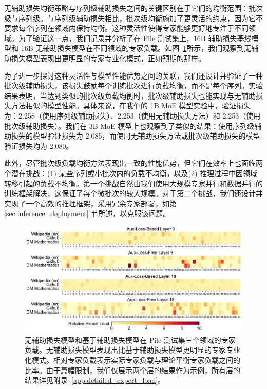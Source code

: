 \documentclass[lang=cn,a4paper,newtx]{elegantpaper}
\begin{document}
无辅助损失均衡策略与序列级辅助损失之间的关键区别在于它们的均衡范围：批次级与序列级。与序列级辅助损失相比，批次级均衡施加了更灵活的约束，因为它不要求每个序列在领域内保持均衡。这种灵活性使得专家能够更好地专注于不同领域。为了验证这一点，我们记录并分析了在 Pile 测试集上，16B 辅助损失基线模型和 16B 无辅助损失模型在不同领域的专家负载。如图~\ref{fig:expert_load}所示，我们观察到无辅助损失模型表现出更明显的专家专业化模式，正如预期的那样。

为了进一步探讨这种灵活性与模型性能优势之间的关联，我们还设计并验证了一种批次级辅助损失，该损失鼓励每个训练批次进行负载均衡，而不是每个序列。实验结果表明，当达到类似的批次级负载均衡时，批次级辅助损失也能实现与无辅助损失方法相似的模型性能。具体来说，在我们的 1B MoE 模型实验中，验证损失为：2.258（使用序列级辅助损失）、2.253（使用无辅助损失方法）和 2.253（使用批次级辅助损失）。我们在 3B MoE 模型上也观察到了类似的结果：使用序列级辅助损失的模型验证损失为 2.085，而使用无辅助损失方法或批次级辅助损失的模型验证损失均为 2.080。

此外，尽管批次级负载均衡方法表现出一致的性能优势，但它们在效率上也面临两个潜在挑战：(1) 某些序列或小批次内的负载不均衡，以及(2) 推理过程中因领域转移引起的负载不均衡。第一个挑战自然由我们使用大规模专家并行和数据并行的训练框架解决，这保证了每个微批次的较大规模。对于第二个挑战，我们还设计并实现了一个高效的推理框架，采用冗余专家部署，如第 \ref{sec:inference_deployment} 节所述，以克服该问题。

\begin{figure}[!t]
\centering
\includegraphics[width=0.99\linewidth]{figures/relative_expert_load_multi.pdf}
\caption{无辅助损失模型和基于辅助损失模型在 Pile 测试集三个领域的专家负载。无辅助损失模型表现出比基于辅助损失模型更明显的专家专业化模式。相对专家负载表示实际专家负载与理论平衡专家负载之间的比率。由于篇幅限制，我们仅展示两个层的结果作为示例，所有层的结果详见附录~\ref{app:detailed_expert_load}。}
\label{fig:expert_load}
\end{figure}
\end{document}
